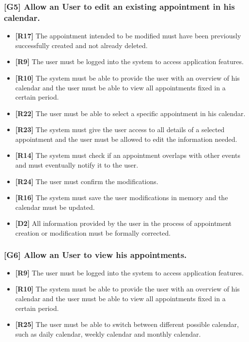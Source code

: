 \subsubsection{[G5] Allow an User to edit an existing appointment in his calendar.}
	\begin{itemize}
		\item \textbf{[R17]} The appointment intended to be modified must have been previously successfully created and not already deleted.
		\item \textbf{[R9]} The user must be logged into the system to access application features.
		\item \textbf{[R10]} The system must be able to provide the user with an overview of his calendar and the user must be able to view all appointments fixed in a certain period.
		\item \textbf{[R22]} The user must be able to select a specific appointment in his calendar.
		\item \textbf{[R23]} The system must give the user access to all details of a selected appointment and the user must be allowed to edit the information needed.
		\item \textbf{[R14]} The system must check if an appointment overlaps with other events and must eventually notify it to the user.
		\item \textbf{[R24]} The user must confirm the modifications.
		\item \textbf{[R16]} The system must save the user modifications in memory and the calendar must be updated.
		\item \textbf{[D2]} All information provided by the user in the process of appointment creation or modification must be formally corrected.
		
	\end{itemize}
\subsubsection{[G6] Allow an User to view his appointments.}
	\begin{itemize}
		\item \textbf{[R9]} The user must be logged into the system to access application features.
		\item \textbf{[R10]} The system must be able to provide the user with an overview of his calendar and the user must be able to view all appointments fixed in a certain period.
		\item \textbf{[R25]} The user must be able to switch between different possible calendar, such as daily calendar, weekly calendar and monthly calendar.
		
	\end{itemize}
